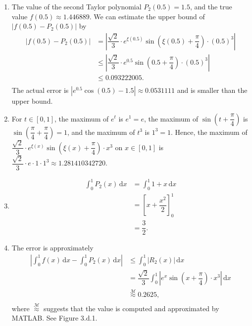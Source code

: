 \documentclass[11pt]{article}
\theoremstyle{break}
\newcommand{\ddi}{\text{$\,$d}}
\numberwithin{equation}{theorem}
\begin{document}
\begin{enumerate}
    \item The value of the second Taylor polynomial $P_2(0.5)=1.5$, and the true value $f(0.5)\approx1.446889$. We can estimate the upper bound of $|f(0.5)-P_2(0.5)|$ by \vspace{-0.6em}
    \begin{align*}
        |f(0.5)-P_2(0.5)|&=\left\lvert \dfrac{\sqrt{2}}{3}\cdot e^{\xi(0.5)}\sin\left(\xi(0.5)+\dfrac{\pi}{4}\right) \cdot ({0.5})^3\right\rvert\\
        &\leq\left\lvert \dfrac{\sqrt{2}}{3}\cdot e^{0.5}\sin\left(0.5+\dfrac{\pi}{4}\right) \cdot ({0.5})^3\right\rvert\\
        &\leq 0.093222005.\\[-3.4em]
    \end{align*}
    The actual error is $\left\lvert e^{0.5}\cos(0.5)-1.5\right\rvert\approx0.0531111$ and is smaller than the upper bound.
    \item For $t\in[0, 1]$, the maximum of $e^t$ is $e^1=e$, the maximum of $\sin\left(t+\dfrac{\pi}{4}\right)$ is $\sin\left(\dfrac{\pi}{4}+\dfrac{\pi}{4}\right)=1$, and the maximum of $t^3$ is $1^3=1$. Hence, the maximum of $\dfrac{\sqrt{2}}{3}\cdot e^{\xi(x)}\sin\left(\xi(x)+\dfrac{\pi}{4}\right) \cdot x^3$ on $x\in[0, 1]$ is $\dfrac{\sqrt{2}}{3}\cdot e\cdot1\cdot1^3\approx1.281410342720$.
    \item \begin{align*}
        \int_{0}^{1}P_2(x)\ddi x&=\int_{0}^{1}1+x\ddi x\\
        &=\left[x+\dfrac{x^2}{2}\right]_0^1\\
        &=\dfrac{3}{2}.
    \end{align*}
    \item The error is approximately \vspace{-0.6em}
    \begin{align*}
        \left|\int_{0}^{1}f(x)\ddi x-\int_{0}^{1}P_2(x)\ddi x\right|&\leq\int_{0}^{1}|R_2(x)|\ddi x\\
        &=\dfrac{\sqrt{2}}{3}\int_{0}^{1}\left|e^x\sin\left(x+\dfrac{\pi}{4}\right) \cdot x^3\right|\ddi x\\
        &\overset{\mathcal{M}}{\approx}0.2625,\\[-3.4em]
    \end{align*}
    where $\overset{\mathcal{M}}{\approx}$ suggests that the value is computed and approximated by MATLAB. See Figure 3.d.1.
    \begin{center}

\end{center}
\end{enumerate}
\end{document}
